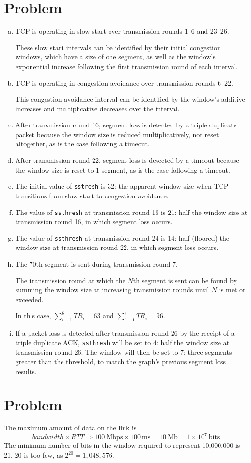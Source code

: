 \documentclass[letterpaper]{article}
\newcommand{\problem}{\section{Problem}}
\newcommand{\bparts}{\begin{enumerate}[(a)]}
\newcommand{\eparts}{\end{enumerate}}
\begin{document}
\problem{}
\bparts
\item
TCP is operating in slow start over transmission rounds 1--6 and 23--26.

These slow start intervals can be identified by their initial congestion
windows, which have a size of one segment, as well as the window's exponential
increase following the first transmission round of each interval.
\item
TCP is operating in congestion avoidance over transmission rounds 6--22.

This congestion avoidance interval can be identified by the window's additive
increases and multiplicative decreases over the interval.
\item
After transmission round 16, segment loss is detected by a triple duplicate
packet because the window size is reduced multiplicatively, not reset
altogether, as is the case following a timeout.
\item
After transmission round 22, segment loss is detected by a timeout because
the window size is reset to 1 segment, as is the case following a timeout.
\item
The initial value of \texttt{sstresh} is 32: the apparent window size
when TCP transitions from slow start to congestion avoidance.
\item
The value of \texttt{ssthresh} at transmission round 18 is 21: half the
window size at transmission round 16, in which segment loss occurs.
\item
The value of \texttt{ssthresh} at transmission round 24 is 14: half
(floored) the window size at transmission round 22, in which segment loss occurs.
\item
The 70th segment is sent during transmission round 7.

The transmission round at which the $N$th segment is sent can be found by
summing the window size at increasing transmission rounds until $N$ is met
or exceeded.

In this case, $\sum_{i=1}^6{TR_i}=63$ and $\sum_{i=1}^7{TR_i}=96$.
\item
If a packet loss is detected after transmission round 26 by the receipt of
a triple duplicate ACK, \texttt{ssthresh} will be set to 4: half the window
size at transmission round 26. The window will then be set to 7: three
segments greater than the threshold, to match the graph's previous segment
loss results.
\eparts

\problem{}
The maximum amount of data on the link is
\begin{equation*}
bandwidth \times RTT \Rightarrow 100\ \mathrm{Mbps} \times 100\ \mathrm{ms}
= 10\ \mathrm{Mb} = 1 \times 10^7\ \mathrm{bits}
\end{equation*}
The minimum number of bits in the window required to represent 10,000,000
is 21. 20 is too few, as \mbox{$2^{20}=1,048,576$}.
\end{document}
